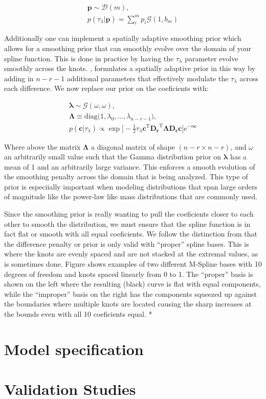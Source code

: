 \begin{align}
    \bm{p} \sim \mathcal{D}(m), \\
    p(\tau_\lambda | \bm{p}) = \sum_i^m p_i \mathcal{G}(1, b_m)
\end{align}

Additionally one can implement a spatially adaptive smoothing prior which allows for a smoothing prior
that can smoothly evolve over the domain of your spline function. This is done in practice by having the $\tau_\lambda$ parameter evolve smoothly
across the knots. , formulates a spatially adaptive prior in this way by adding in $n-r-1$ additional parameters that
effectively modulate the $\tau_\lambda$ across each difference. We now replace our prior on the coeficients with:

\begin{eqnarray}
\bm{\lambda} \sim \mathcal{G}(\omega, \omega), \\
\bm{\Lambda} \equiv \mathrm{diag}\big(1, \lambda_0,...,\lambda_{n-r-1}\big), \\
p(\bm{c} | \tau_\lambda) \propto \exp \big[ -\frac{1}{2} \tau_\lambda \bm{c}^{\mathrm{T}} \bm{D_r}^{\mathrm{T}} \bm{\Lambda} \bm{D_r} \bm{c} \big] e^{-n\bm{c}}
\end{eqnarray}

Where above the matrix $\bm{\Lambda}$ a diagonal matrix of shape $(n-r \times n-r)$, and $\omega$ an arbitrarily small value such that the Gamma distribution 
prior on $\bm{\lambda}$ has a mean of 1 and an arbitrarily large variance. This enforces a smooth evolution of the smoothing penalty 
across the domain that is being analyzed. This type of prior is especiially important when modeling distributions that span large orders of magnitude like 
the power-law like mass distributions that are commonly used. 

Since the smoothing prior is really wanting to pull the coeficients closer to each other to smooth the distribution, 
we must ensure that the spline function is in fact flat or smooth with all equal coeficients. We follow the distinction from  that the difference
penalty or prior is only valid with ``proper'' spline bases. This is where the knots are evenly spaced and are not stacked at the extremal values, 
as is sometimes done. Figure shows examples of two different M-Spline bases with 10 degrees of freedom and knots spaced linearly from 0 to 1. The ``proper''
basis is shown on the left where the resulting (black) curve is flat with equal components, while the ``improper'' basis on the right has the 
components squeezed up against the boundaries where multiple knots are located causing the sharp increases at the bounds even with all 10 coeficients equal.
*\

\section{Model specification} \label{sec:modelpriors}

\section{Validation Studies} \label{sec:validation}
